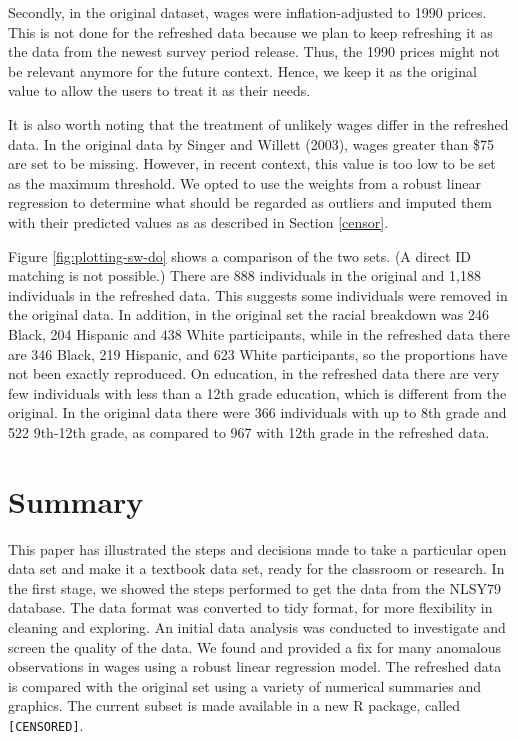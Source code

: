 \documentclass{article}
\begin{document}
Secondly, in the original dataset, wages were inflation-adjusted to 1990 prices. This is not done for the refreshed data because we plan to keep refreshing it as the data from the newest survey period release. Thus, the 1990 prices might not be relevant anymore for the future context. Hence, we keep it as the original value to allow the users to treat it as their needs.

It is also worth noting that the treatment of unlikely wages differ in the refreshed data. In the original data by Singer and Willett (2003), wages greater than \$75 are set to be missing. However, in recent context, this value is too low to be set as the maximum threshold. We opted to use the weights from a robust linear regression to determine what should be regarded as outliers and imputed them with their predicted values as as described in Section \ref{censor}.

Figure \ref{fig:plotting-sw-do} shows a comparison of the two sets. (A direct ID matching is not possible.) There are 888 individuals in the original and 1,188 individuals in the refreshed data. This suggests some individuals were removed in the original data.
In addition, in the original set the racial breakdown was 246 Black, 204 Hispanic and 438 White participants, while in the refreshed data there are 346 Black, 219 Hispanic, and 623 White participants, so the proportions have not been exactly reproduced. On education, in the refreshed data there are very few individuals with less than a 12th grade education, which is different from the original. In the original data there were 366 individuals with up to 8th grade and 522 9th-12th grade, as compared to 967 with 12th grade in the refreshed data.

\hypertarget{summary}{%
\section{Summary}\label{summary}}

This paper has illustrated the steps and decisions made to take a particular open data set and make it a textbook data set, ready for the classroom or research. In the first stage, we showed the steps performed to get the data from the NLSY79 database. The data format was converted to tidy format, for more flexibility in cleaning and exploring. An initial data analysis was conducted to investigate and screen the quality of the data. We found and provided a fix for many anomalous observations in wages using a robust linear regression model. The refreshed data is compared with the original set using a variety of numerical summaries and graphics. The current subset is made available in a new R package, called \texttt{[CENSORED]}.
\end{document}
